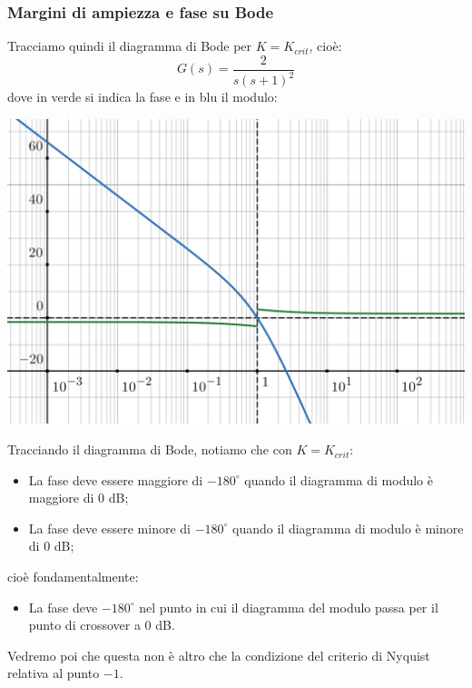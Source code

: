 \documentclass[a4paper,11pt]{article}
\begin{document}
\subsubsection{Margini di ampiezza e fase su Bode}

Tracciamo quindi il diagramma di Bode per $K = K_{crit}$, cioè:
$$
G(s) = \frac{2}{s(s + 1)^2}
$$
dove in verde si indica la fase e in blu il modulo:
\begin{center}
	\includegraphics[scale=0.28]{../figures/bode_margin.png}
\end{center}

Tracciando il diagramma di Bode, notiamo che con $K = K_{crit}$:
\begin{itemize}
	\item La fase deve essere maggiore di $-180^\circ$ quando il diagramma di modulo è maggiore di 0 dB;
	\item La fase deve essere minore di $-180^\circ$ quando il diagramma di modulo è minore di 0 dB;
\end{itemize}
cioè fondamentalmente:
\begin{itemize}
	\item La fase deve $-180^\circ$ nel punto in cui il diagramma del modulo passa per il punto di crossover a 0 dB.
\end{itemize}

Vedremo poi che questa non è altro che la condizione del criterio di Nyquist relativa al punto $-1$.
\end{document}
